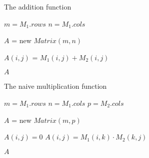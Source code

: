 \documentclass{article}
\begin{document}
\begin{algorithm}
\caption{The addition function}
\begin{algorithmic}[1]

\State $m = M_1.rows$
\State $n = M_1.cols$

\State $A$ = new $Matrix(m,n)$

		\State $A(i,j)$ = $M_1(i,j) + M_2(i,j)$
	\EndFor
\EndFor

\State \Return $A$

\EndFunction
\end{algorithmic}
\end{algorithm}


\begin{algorithm}
\caption{The naive multiplication function}
\begin{algorithmic}[1]

\State $m = M_1.rows$
\State $n = M_1.cols$
\State $p = M_2.cols$

\State $A$ = new $Matrix(m,p)$

		\State $A(i,j) = 0$
			\State $A(i,j) = M_1(i,k) \cdot M_2(k,j)$
		\EndFor
	\EndFor
\EndFor

\State \Return $A$

\EndFunction
\end{algorithmic}
\end{algorithm}
\end{document}
